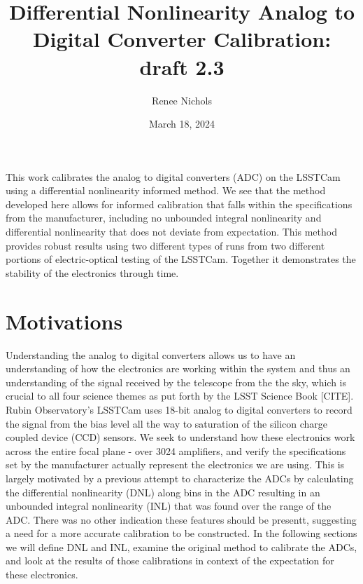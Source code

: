 \documentclass[11pt, letterpaper]{article}
\title{Differential Nonlinearity Analog to Digital Converter Calibration: draft 2.3}
\author{Renee Nichols}
\date{March 18, 2024}
\begin{document}
\maketitle 

This work calibrates the analog to digital converters (ADC) on the LSSTCam using a differential nonlinearity informed method. 
We see that the method developed here allows for informed calibration that falls within the specifications from the manufacturer, including no unbounded integral nonlinearity and differential nonlinearity that does not deviate from expectation. 
This method provides robust results using two different types of runs from two different portions of electric-optical testing of the LSSTCam. 
Together it demonstrates the stability of the electronics through time. 

\section{Motivations}
\indent

 
Understanding the analog to digital converters allows us to have an understanding of how the electronics are working within the system and thus an understanding of the signal received by the telescope from the the sky, which is crucial to all four science themes as put forth by the LSST Science Book [CITE]. 
Rubin Observatory’s LSSTCam uses 18-bit analog to digital converters to record the signal from the bias level all the way to saturation of the silicon charge coupled device (CCD) sensors. 
We seek to understand how these electronics work across the entire focal plane - over 3024 amplifiers, and verify the specifications set by the manufacturer actually represent the electronics we are using. 
This is largely motivated by a previous attempt to characterize the ADCs by calculating the differential nonlinearity (DNL) along bins in the ADC resulting in an unbounded integral nonlinearity (INL) that was found over the range of the ADC. 
There was no other indication these features should be presentt, suggesting a need for a more accurate calibration to be constructed. 
In the following sections we will define DNL and INL, examine the original method to calibrate the ADCs, and look at the results of those calibrations in context of the expectation for these electronics. 
\end{document}
